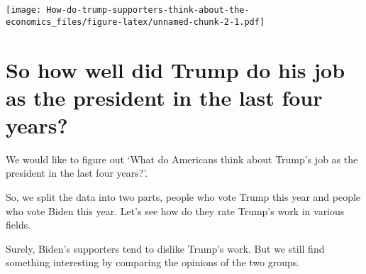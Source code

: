 \documentclass[
]{article}
\newenvironment{Shaded}{\begin{snugshade}}{\end{snugshade}}
\newcommand{\DataTypeTok}[1]{\textcolor[rgb]{0.13,0.29,0.53}{#1}}
\newcommand{\DecValTok}[1]{\textcolor[rgb]{0.00,0.00,0.81}{#1}}
\newcommand{\FloatTok}[1]{\textcolor[rgb]{0.00,0.00,0.81}{#1}}
\newcommand{\KeywordTok}[1]{\textcolor[rgb]{0.13,0.29,0.53}{\textbf{#1}}}
\newcommand{\NormalTok}[1]{#1}
\newcommand{\OtherTok}[1]{\textcolor[rgb]{0.56,0.35,0.01}{#1}}
\newcommand{\StringTok}[1]{\textcolor[rgb]{0.31,0.60,0.02}{#1}}
\begin{document}
\begin{Shaded}
\end{Shaded}

\texttt{[image: How-do-trump-supporters-think-about-the-economics\_files/figure-latex/unnamed-chunk-2-1.pdf]}

\hypertarget{so-how-well-did-trump-do-his-job-as-the-president-in-the-last-four-years}{%
\section{So how well did Trump do his job as the president in the last
four
years?}\label{so-how-well-did-trump-do-his-job-as-the-president-in-the-last-four-years}}

We would like to figure out `What do Americans think about Trump's job
as the president in the last four years?'.

So, we split the data into two parts, people who vote Trump this year
and people who vote Biden this year. Let's see how do they rate Trump's
work in various fields.

Surely, Biden's supporters tend to dislike Trump's work. But we still
find something interesting by comparing the opinions of the two groups.
\end{document}
